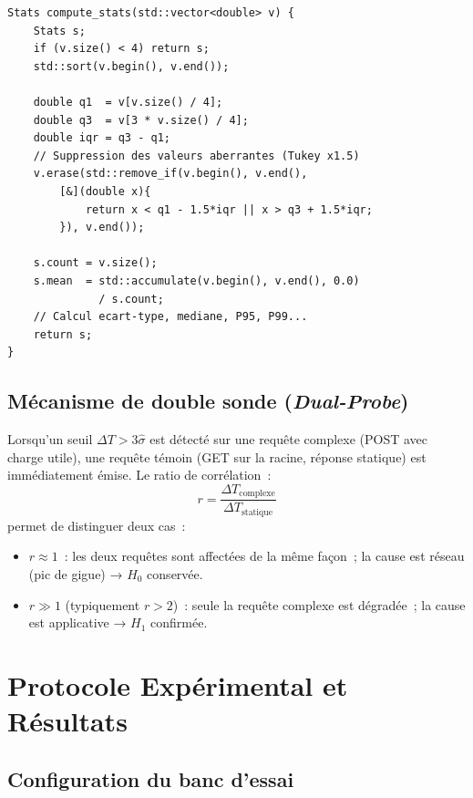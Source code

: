 \documentclass[10pt,conference,compsoc]{IEEEtran}
\begin{document}
\begin{lstlisting}[caption={Filtre IQR et calcul des statistiques descriptives},
                   label={lst:iqr}]
Stats compute_stats(std::vector<double> v) {
    Stats s;
    if (v.size() < 4) return s;
    std::sort(v.begin(), v.end());

    double q1  = v[v.size() / 4];
    double q3  = v[3 * v.size() / 4];
    double iqr = q3 - q1;
    // Suppression des valeurs aberrantes (Tukey x1.5)
    v.erase(std::remove_if(v.begin(), v.end(),
        [&](double x){
            return x < q1 - 1.5*iqr || x > q3 + 1.5*iqr;
        }), v.end());

    s.count = v.size();
    s.mean  = std::accumulate(v.begin(), v.end(), 0.0)
              / s.count;
    // Calcul ecart-type, mediane, P95, P99...
    return s;
}
\end{lstlisting}

\subsection{Mécanisme de double sonde (\textit{Dual-Probe})}

Lorsqu'un seuil $\Delta T > 3\hat{\sigma}$ est détecté sur une requête
complexe (POST avec charge utile), une requête témoin (GET sur la
racine, réponse statique) est immédiatement émise. Le ratio
de corrélation~:
\begin{equation}
    r = \frac{\Delta T_{\mathrm{complexe}}}{\Delta T_{\mathrm{statique}}}
    \label{eq:ratio}
\end{equation}
permet de distinguer deux cas~:
\begin{itemize}
    \item $r \approx 1$~: les deux requêtes sont affectées de la même
      façon~; la cause est réseau (pic de gigue) → $H_0$ conservée.
    \item $r \gg 1$ (typiquement $r > 2$)~: seule la requête complexe
      est dégradée~; la cause est applicative → $H_1$ confirmée.
\end{itemize}

\section{Protocole Expérimental et Résultats}
\label{sec:resultats}

\subsection{Configuration du banc d'essai}
\end{document}
